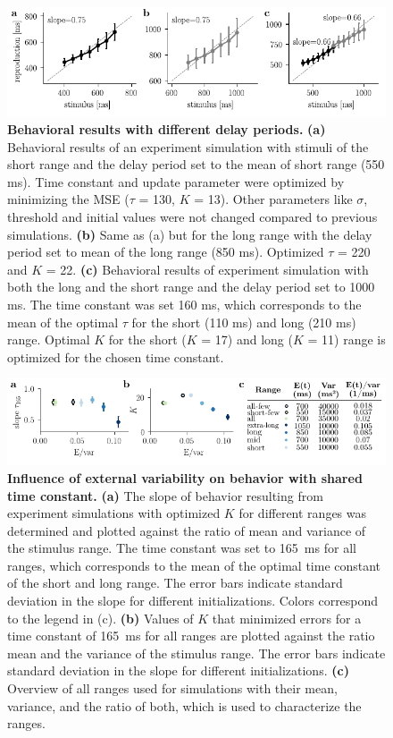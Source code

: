 \documentclass[10pt, a4paper]{article}
\begin{document}
\begin{figure}[!htb]
	\centering
	\includegraphics{figures/supp_delay.pdf}
	\caption{\textbf{Behavioral results with different delay periods.}
	\textbf{(a)} Behavioral results of an experiment simulation with stimuli of the short range and the delay period set to the mean of short range (550 ms). Time constant and update parameter were optimized by minimizing the MSE ($\tau$ = 130, $K$ = 13). Other parameters like $\sigma$, threshold and initial values were not changed compared to previous simulations.
	\textbf{(b)} Same as (a) but for the long range with the delay period set to mean of the long range (850 ms). Optimized $\tau$ = 220 and $K$ = 22.
	\textbf{(c)} Behavioral results of experiment simulation with both the long and the short range and the delay period set to 1000 ms. The time constant was set 160 ms, which corresponds to the mean of the optimal $\tau$ for the short (110 ms) and long (210 ms) range. Optimal $K$ for the short ($K$ = 17) and long ($K$ = 11) range is optimized for the chosen time constant. 
	}
\label{sup:delay}
\end{figure}

\begin{figure}[!htb]
	\centering
	\includegraphics{figures/supp_ranges_new.pdf}
	\caption{\textbf{Influence of external variability on behavior with shared time constant.}
	\textbf{(a)} The slope of behavior resulting from experiment simulations with optimized $K$ for different ranges was determined and plotted against the ratio of mean and variance of the stimulus range. The time constant was set to 165~ms for all ranges, which corresponds to the mean of the optimal time constant of the short and long range. The error bars indicate standard deviation in the slope for different initializations. Colors correspond to the legend in (c). 
	\textbf{(b)} Values of $K$ that minimized errors for a time constant of 165~ms for all ranges are plotted against the ratio mean and the variance of the stimulus range.
	The error bars indicate standard deviation in the slope for different initializations. 
	\textbf{(c)} Overview of all ranges used for simulations with their mean, variance, and the ratio of both, which is used to characterize the ranges.
	}
\label{sup:ranges}
\end{figure}
\end{document}
